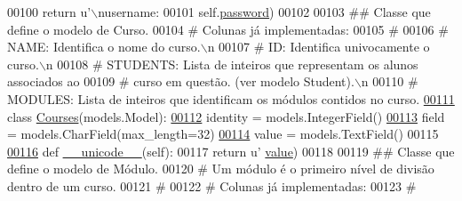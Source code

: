 \begin{DoxyCode}
{{{00100         \textcolor{keywordflow}{return} \textcolor{stringliteral}{u'\(\backslash\)nusername: %
00101                                                        self.\hyperlink{classELO_1_1models_1_1God_ae566fce421f4a31517a053af2abcff31}{password})
00102 
00103 \textcolor{comment}{## Classe que define o modelo de Curso.}
00104 \textcolor{comment}{#   Colunas já implementadas:}
00105 \textcolor{comment}{#}
00106 \textcolor{comment}{#   NAME:       Identifica o nome do curso.\(\backslash\)n}
00107 \textcolor{comment}{#   ID:         Identifica univocamente o curso.\(\backslash\)n}
00108 \textcolor{comment}{#   STUDENTS:   Lista de inteiros que representam os alunos associados ao}
00109 \textcolor{comment}{#                   curso em questão. (ver modelo Student).\(\backslash\)n}
00110 \textcolor{comment}{#   MODULES:    Lista de inteiros que identificam os módulos contidos no curso.}
\hypertarget{ELO_2models_8py_source_l00111}{}\hyperlink{classELO_1_1models_1_1Courses}{00111} \textcolor{keyword}{class }\hyperlink{classELO_1_1models_1_1Courses}{Courses}(models.Model):
\hypertarget{ELO_2models_8py_source_l00112}{}\hyperlink{classELO_1_1models_1_1Courses_a83d1bd0bc45319f3b88446f87f42a03e}{00112}     identity = models.IntegerField()
\hypertarget{ELO_2models_8py_source_l00113}{}\hyperlink{classELO_1_1models_1_1Courses_a0ecbb317d4d82d5630b7a16a1df1711d}{00113}     field = models.CharField(max\_length=32)
\hypertarget{ELO_2models_8py_source_l00114}{}\hyperlink{classELO_1_1models_1_1Courses_a2b3c228ef67c767570b3555b3b7f1de2}{00114}     value = models.TextField()
00115 
\hypertarget{ELO_2models_8py_source_l00116}{}\hyperlink{classELO_1_1models_1_1Courses_a8676cba71b99ab2ba60726b9b5e33825}{00116}     \textcolor{keyword}{def }\hyperlink{classELO_1_1models_1_1Courses_a8676cba71b99ab2ba60726b9b5e33825}{\_\_unicode\_\_}(self):
00117         \textcolor{keywordflow}{return} \textcolor{stringliteral}{u'%
      \hyperlink{classELO_1_1models_1_1Courses_a2b3c228ef67c767570b3555b3b7f1de2}{value})
00118 
00119 \textcolor{comment}{## Classe que define o modelo de Módulo.}
00120 \textcolor{comment}{#   Um módulo é o primeiro nível de divisão dentro de um curso.}
00121 \textcolor{comment}{#}
00122 \textcolor{comment}{#   Colunas já implementadas:}
00123 \textcolor{comment}{#}
}}}}}
\end{DoxyCode}
